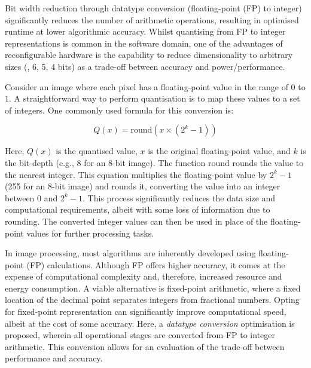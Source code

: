 Bit width reduction through datatype conversion (\eg floating-point (FP) to integer) significantly reduces the number of arithmetic operations, resulting in optimised runtime at lower algorithmic accuracy. Whilst quantising from FP to integer representations is common in the software domain, one of the advantages of reconfigurable hardware is the capability to reduce dimensionality to arbitrary sizes (, 6, 5, 4 bits) as a trade-off between accuracy and power/performance.

Consider an image where each pixel has a floating-point value in the range of \(0\) to \(1\). A straightforward way to perform quantisation is to map these values to a set of integers. One commonly used formula for this conversion is:

\begin{equation}
Q(x) = \text{round}(x \times (2^k - 1))
\end{equation}

Here, \( Q(x) \) is the quantised value, \( x \) is the original floating-point value, and \( k \) is the bit-depth (e.g., \(8\) for an 8-bit image). The function \(\text{round}\) rounds the value to the nearest integer. This equation multiplies the floating-point value by \(2^k - 1\) (255 for an 8-bit image) and rounds it, converting the value into an integer between \(0\) and \(2^k - 1\). This process significantly reduces the data size and computational requirements, albeit with some loss of information due to rounding. The converted integer values can then be used in place of the floating-point values for further processing tasks.

In image processing, most algorithms are inherently developed using floating-point (FP) calculations. Although FP offers higher accuracy, it comes at the expense of computational complexity and, therefore, increased resource and energy consumption. A viable alternative is fixed-point arithmetic, where a fixed location of the decimal point separates integers from fractional numbers. Opting for fixed-point representation can significantly improve computational speed, albeit at the cost of some accuracy. Here, a \textit{datatype conversion} optimisation is proposed, wherein all operational stages are converted from FP to integer arithmetic. This conversion allows for an evaluation of the trade-off between performance and accuracy.



